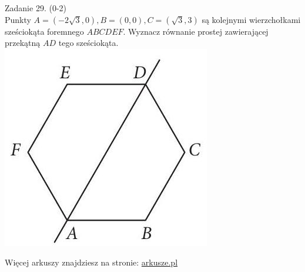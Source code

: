 \documentclass[10pt]{article}
\begin{document}
Zadanie 29. (0-2)\\
Punkty \(A=(-2 \sqrt{3}, 0), B=(0,0), C=(\sqrt{3}, 3)\) są kolejnymi wierzchołkami sześciokąta foremnego \(A B C D E F\). Wyznacz równanie prostej zawierającej przekątną \(A D\) tego sześciokąta.\\
\includegraphics[max width=\textwidth, center]{2024_11_21_72158d4a4efa7dd894bcg-17}

Więcej arkuszy znajdziesz na stronie: \href{http://arkusze.pl}{arkusze.pl}
\end{document}
